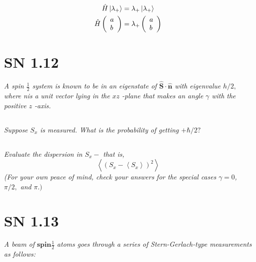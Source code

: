 \documentclass{article}
\begin{document}
\begin{align*}
    \hat{H} \ket{\lambda_+} &= \lambda_+ \ket{\lambda_+}\\
    \hat{H} \left(\begin{array}{l}
        a \\
        b
        \end{array}\right) &= \lambda_+ \left(\begin{array}{l}
        a \\
        b
        \end{array}\right)\\
\end{align*}



\newpage

\section{SN 1.12}
\textit{A spin $\frac{1}{2}$ system is known to be in an eigenstate of $\hat{\mathbf{S}} \cdot \hat{\mathbf{n}}$ with eigenvalue $h / 2,$ where nis a unit vector lying in the $x z$ -plane that makes an angle $\gamma$ with the positive $z$ -axis.}
\subsection{}
\textit{Suppose $S_{x}$ is measured. What is the probability of getting $+\hbar / 2 ?$}



\subsection{}
\textit{Evaluate the dispersion in $S_{x}-$ that is,
$$
\left\langle\left(S_{x}-\left\langle S_{x}\right\rangle\right)^{2}\right\rangle
$$
(For your own peace of mind, check your answers for the special cases $\gamma=0$, $\pi / 2,$ and $\pi .)$}





\newpage


\section{SN 1.13}
\textit{A beam of $\mathbf{spin} \frac{1}{2}$ atoms goes through a series of Stern-Gerlach-type measurements as follows:}
\end{document}
